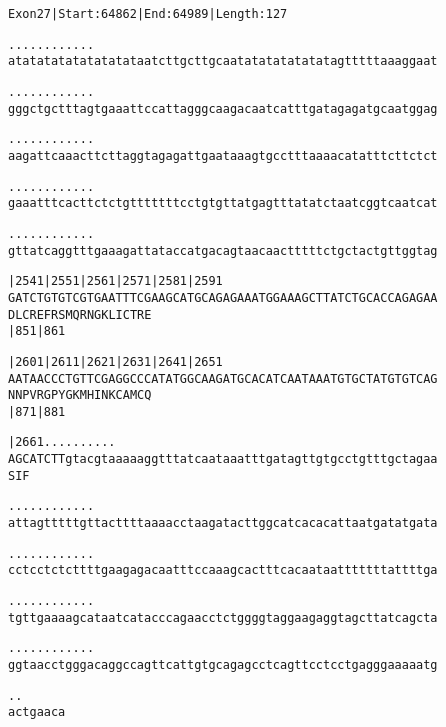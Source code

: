 \documentclass{article}
\begin{document}
\begin{alltt}
Exon 27 | Start: 64862 | End: 64989 | Length: 127

.    .    .    .    .    .    .    .    .    .    .    .
atatatatatatatatataatcttgcttgcaatatatatatatatagtttttaaaggaat



.    .    .    .    .    .    .    .    .    .    .    .
gggctgctttagtgaaattccattagggcaagacaatcatttgatagagatgcaatggag



.    .    .    .    .    .    .    .    .    .    .    .
aagattcaaacttcttaggtagagattgaataaagtgcctttaaaacatatttcttctct



.    .    .    .    .    .    .    .    .    .    .    .
gaaatttcacttctctgtttttttcctgtgttatgagtttatatctaatcggtcaatcat



.    .    .    .    .    .    .    .    .    .    .    .
gttatcaggtttgaaagattataccatgacagtaacaactttttctgctactgttggtag



  |2541     |2551     |2561     |2571     |2581     |2591
GATCTGTGTCGTGAATTTCGAAGCATGCAGAGAAATGGAAAGCTTATCTGCACCAGAGAA
D  L  C  R  E  F  R  S  M  Q  R  N  G  K  L  I  C  T  R  E
            |851                          |861

  |2601     |2611     |2621     |2631     |2641     |2651
AATAACCCTGTTCGAGGCCCATATGGCAAGATGCACATCAATAAATGTGCTATGTGTCAG
N  N  P  V  R  G  P  Y  G  K  M  H  I  N  K  C  A  M  C  Q
            |871                          |881

  |2661     .    .    .    .    .    .    .    .    .    .
AGCATCTTgtacgtaaaaaggtttatcaataaatttgatagttgtgcctgtttgctagaa
S  I  F


\end{alltt}
\newpage
\begin{alltt}
  .    .    .    .    .    .    .    .    .    .    .    .
attagtttttgttacttttaaaacctaagatacttggcatcacacattaatgatatgata



  .    .    .    .    .    .    .    .    .    .    .    .
cctcctctcttttgaagagacaatttccaaagcactttcacaataatttttttattttga



  .    .    .    .    .    .    .    .    .    .    .    .
tgttgaaaagcataatcatacccagaacctctggggtaggaagaggtagcttatcagcta



  .    .    .    .    .    .    .    .    .    .    .    .
ggtaacctgggacaggccagttcattgtgcagagcctcagttcctcctgagggaaaaatg



  .    .
actgaaca


\end{alltt}
\end{document}
